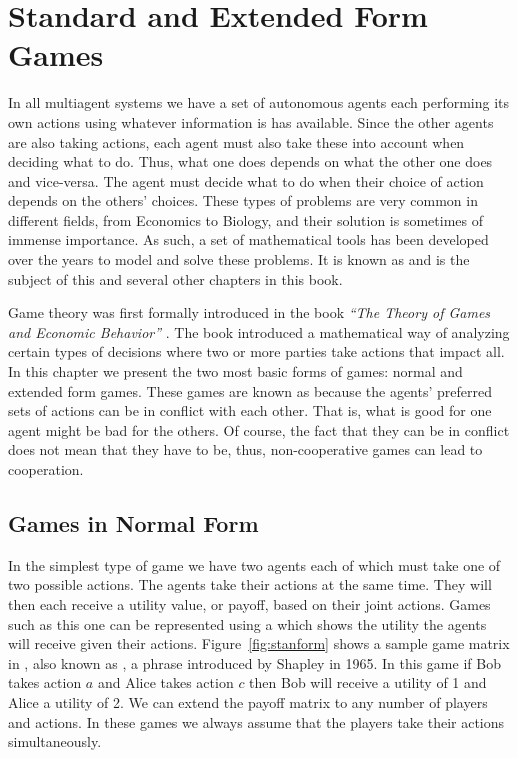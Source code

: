 \chapter{Standard and Extended Form Games}
\label{cha:game-theory}

  In all
multiagent systems we have a set of autonomous agents each performing
its own actions using whatever information is has available. Since the
other agents are also taking actions, each agent must also take these
into account when deciding what to do. Thus, what one does depends on
what the other one does and vice-versa. The agent must decide what to
do when their choice of action depends on the others' choices. These
types of problems are very common in different fields, from Economics
to Biology, and their solution is sometimes of immense importance. As
such, a set of mathematical tools has been developed over the years to
model and solve these problems. It is known as  and is
the subject of this and several other chapters in this book.

Game theory was first formally introduced in the book \emph{``The
  Theory of Games and Economic Behavior''} \cite{neumann44a}. The book
introduced a mathematical way of analyzing certain types of decisions
where two or more parties take actions that impact all. In this
chapter we present the two most basic forms of games: normal and
extended form games.  These games are known as  because the agents' preferred sets of actions can be in
conflict with each other.  That is, what is good for one agent might
be bad for the others. Of course, the fact that they can be in
conflict does not mean that they have to be, thus, non-cooperative
games can lead to cooperation.

\section{Games in Normal Form}
\label{sec:normal-form}

In the simplest type of game we have two agents each of which must
take one of two possible actions. The agents take their actions at the
same time. They will then each receive a utility value, or payoff,
based on their joint actions. Games such as this one can be
represented using a  which shows the utility the
agents will receive given their actions.  Figure~\ref{fig:stanform}
shows a sample game matrix in , also known as
, a phrase introduced by Shapley in 1965.  In this
game if Bob takes action $a$ and Alice takes action $c$ then Bob will
receive a utility of 1 and Alice a utility of 2. We can extend the
payoff matrix to any number of players and actions. In these games we
always assume that the players take their actions simultaneously.

